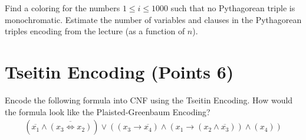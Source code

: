 \documentclass{article}
\begin{document}
Find a coloring for the numbers $1 \leq i \leq 1000$ such that no Pythagorean triple is monochromatic.
Estimate the number of variables and clauses in the Pythagorean triples encoding from the lecture (as a function of $n$).

\section{Tseitin Encoding (Points 6)}

Encode the following formula into CNF using the Tseitin Encoding. How would the formula look like the Plaisted-Greenbaum Encoding?
\begin{align*}
(\overline{x_1} \wedge \overline{(x_3 \iff x_2)}) \vee ((x_3 \rightarrow \overline{x_4}) \wedge (x_1 \rightarrow (x_2 \wedge \overline{x_3})) \wedge (x_4))
\end{align*}
\end{document}
